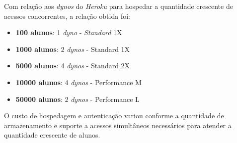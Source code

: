 \documentclass[
    12pt,               %
    openright,          %
    oneside,
    a4paper,            %
    paginasA3,  %
    MODELO,             %
    TODO,               %
    english,            %
    brazil              %
    ]{ifsp-spo-inf-ctds} %
\begin{document}
Com relação aos \textit{dynos} do \textit{Heroku} para hospedar a quantidade crescente de acessos concorrentes, a relação obtida foi:
\begin{itemize}
    \item \textbf{100 alunos}: 1 \textit{dyno} - \textit{Standard} 1X
    \item \textbf{1000 alunos}: 2 \textit{dynos} - Standard 1X
    \item \textbf{5000 alunos}: 4 \textit{dynos} - Standard 2X
    \item \textbf{10000 alunos}: 4 \textit{dynos} - Performance M
    \item \textbf{50000 alunos}: 2 \textit{dynos} - Performance L
\end{itemize}

O custo de hospedagem e autenticação variou conforme a quantidade de armazenamento e suporte a acessos simultâneos necessários para atender a quantidade crescente de alunos.


%
%
%
%



%






%

%



\end{document}
